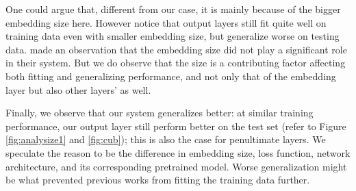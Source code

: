 \documentclass[10pt,twocolumn,letterpaper]{article}
\begin{document}
One could argue that, different from our case, it is mainly because of the bigger embedding size here. However notice that output layers still fit quite well on training data even with smaller embedding size, but generalize worse on testing data. \cite{oh2016deep} made an observation that the embedding size did not play a significant role in their system. But we do observe that the size is a contributing factor affecting both fitting and generalizing performance, and not only that of the embedding layer but also other layers' as well.

Finally, we observe that our system generalizes better: at similar training performance, our output layer still perform better on the test set (refer to Figure \ref{fig:analysize1} and \ref{fig:cub}); this is also the case for penultimate layers. We speculate the reason to be the difference in embedding size, loss function, network architecture, and its corresponding pretrained model. Worse generalization might be what prevented previous works from fitting the training data further.
\end{document}
